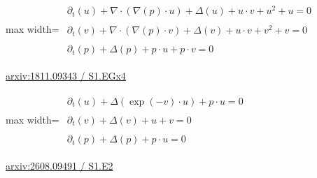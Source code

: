 \documentclass[UTF8,10pt,a4paper,fontset=mac]{ctexart}
\begin{document}
\begin{minipage}{\linewidth}\begin{center}\begin{adjustbox}{max width=\linewidth}$\displaystyle\begin{gathered}\begin{gathered}\partial_{t}(u)+\nabla\cdot(\nabla(p)\cdot u)+\Delta(u)+u\cdot v+u^{2}+u=0\end{gathered}\\[5pt]\begin{gathered}\partial_{t}(v)+\nabla\cdot(\nabla(p)\cdot v)+\Delta(v)+u\cdot v+v^{2}+v=0\end{gathered}\\[5pt]\begin{gathered}\partial_{t}(p)+\Delta(p)+p\cdot u+p\cdot v=0\end{gathered}\end{gathered}$\end{adjustbox}\end{center}{\small\href{https://arxiv.org/html/1811.09343#S1.EGx4}{arxiv:1811.09343 / S1.EGx4}}\par\end{minipage}\par\vspace{6mm}

\begin{minipage}{\linewidth}\begin{center}\begin{adjustbox}{max width=\linewidth}$\displaystyle\begin{gathered}\begin{gathered}\partial_{t}(u)+\Delta(\exp(-v)\cdot u)+p\cdot u=0\end{gathered}\\[5pt]\begin{gathered}\partial_{t}(v)+\Delta(v)+u+v=0\end{gathered}\\[5pt]\begin{gathered}\partial_{t}(p)+\Delta(p)+p\cdot u=0\end{gathered}\end{gathered}$\end{adjustbox}\end{center}{\small\href{https://arxiv.org/html/2608.09491#S1.E2}{arxiv:2608.09491 / S1.E2}}\par\end{minipage}\par\vspace{6mm}
\end{document}
